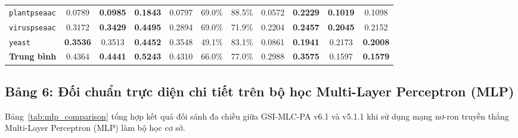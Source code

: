 \documentclass[11pt,a4paper]{article}
\begin{document}
\begin{table}[H]
{\begin{tabular}{lcccccccccc}
\texttt{plantpseaac} & 0.0789 & \textbf{0.0985} & \textbf{0.1843} & 0.0797 & 69.0\% & 88.5\% & 0.0572 & \textbf{0.2229} & \textbf{0.1019} & 0.1098 \\
\texttt{viruspseaac} & 0.3172 & \textbf{0.3429} & \textbf{0.4495} & 0.2894 & 69.0\% & 71.9\% & 0.2204 & \textbf{0.2457} & \textbf{0.2045} & 0.2152 \\
\texttt{yeast} & \textbf{0.3536} & 0.3513 & \textbf{0.4452} & 0.3548 & 49.1\% & 83.1\% & 0.0861 & \textbf{0.1941} & 0.2173 & \textbf{0.2008} \\
\midrule
\textbf{Trung bình} & 0.4364 & \textbf{0.4441} & \textbf{0.5243} & 0.4310 & 66.0\% & 77.0\% & 0.2988 & \textbf{0.3575} & 0.1597 & \textbf{0.1579} \\
\bottomrule
\end{tabular}%
}
\end{table}

\subsection{Bảng 6: Đối chuẩn trực diện chi tiết trên bộ học Multi-Layer Perceptron (MLP)}
Bảng~\ref{tab:mlp_comparison} tổng hợp kết quả đối sánh đa chiều giữa GSI-MLC-PA v6.1 và v5.1.1 khi sử dụng mạng nơ-ron truyền thẳng Multi-Layer Perceptron (MLP) làm bộ học cơ sở.
\end{document}
